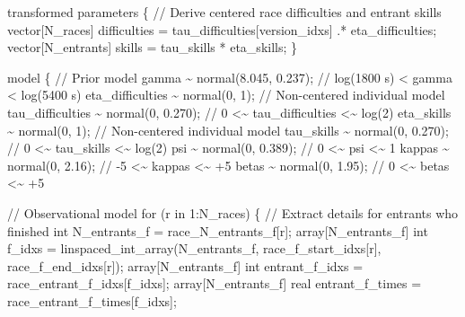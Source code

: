 \documentclass[
  letterpaper,
  DIV=11,
  numbers=noendperiod]{scrartcl}
\newenvironment{Shaded}{\begin{snugshade}}{\end{snugshade}}
\newcommand{\CommentTok}[1]{\textcolor[rgb]{0.37,0.37,0.37}{#1}}
\newcommand{\ControlFlowTok}[1]{\textcolor[rgb]{0.00,0.23,0.31}{#1}}
\newcommand{\DataTypeTok}[1]{\textcolor[rgb]{0.68,0.00,0.00}{#1}}
\newcommand{\DecValTok}[1]{\textcolor[rgb]{0.68,0.00,0.00}{#1}}
\newcommand{\FloatTok}[1]{\textcolor[rgb]{0.68,0.00,0.00}{#1}}
\newcommand{\KeywordTok}[1]{\textcolor[rgb]{0.00,0.23,0.31}{#1}}
\newcommand{\NormalTok}[1]{\textcolor[rgb]{0.00,0.23,0.31}{#1}}
\begin{document}
\begin{codelisting}
\begin{Shaded}
\begin{Highlighting}[]
\KeywordTok{transformed parameters}\NormalTok{ \{}
  \CommentTok{// Derive centered race difficulties and entrant skills}
  \DataTypeTok{vector}\NormalTok{[N\_races] difficulties}
\NormalTok{    = tau\_difficulties[version\_idxs] .* eta\_difficulties;}
  \DataTypeTok{vector}\NormalTok{[N\_entrants] skills}
\NormalTok{    = tau\_skills * eta\_skills;}
\NormalTok{\}}

\KeywordTok{model}\NormalTok{ \{}
  \CommentTok{// Prior model}
\NormalTok{  gamma \textasciitilde{} normal(}\FloatTok{8.045}\NormalTok{, }\FloatTok{0.237}\NormalTok{); }\CommentTok{// log(1800 s) \textless{} gamma \textless{} log(5400 s)}
\NormalTok{  eta\_difficulties \textasciitilde{} normal(}\DecValTok{0}\NormalTok{, }\DecValTok{1}\NormalTok{);     }\CommentTok{// Non{-}centered individual model}
\NormalTok{  tau\_difficulties \textasciitilde{} normal(}\DecValTok{0}\NormalTok{, }\FloatTok{0.270}\NormalTok{); }\CommentTok{// 0 \textless{}\textasciitilde{} tau\_difficulties \textless{}\textasciitilde{} log(2)}
\NormalTok{  eta\_skills \textasciitilde{} normal(}\DecValTok{0}\NormalTok{, }\DecValTok{1}\NormalTok{);           }\CommentTok{// Non{-}centered individual model}
\NormalTok{  tau\_skills \textasciitilde{} normal(}\DecValTok{0}\NormalTok{, }\FloatTok{0.270}\NormalTok{);       }\CommentTok{// 0 \textless{}\textasciitilde{}    tau\_skills    \textless{}\textasciitilde{} log(2)}
\NormalTok{  psi \textasciitilde{} normal(}\DecValTok{0}\NormalTok{, }\FloatTok{0.389}\NormalTok{);       }\CommentTok{// 0 \textless{}\textasciitilde{} psi \textless{}\textasciitilde{} 1}
\NormalTok{  kappas \textasciitilde{} normal(}\DecValTok{0}\NormalTok{, }\FloatTok{2.16}\NormalTok{);     }\CommentTok{// {-}5 \textless{}\textasciitilde{} kappas \textless{}\textasciitilde{} +5}
\NormalTok{  betas \textasciitilde{} normal(}\DecValTok{0}\NormalTok{, }\FloatTok{1.95}\NormalTok{);      }\CommentTok{// 0 \textless{}\textasciitilde{} betas \textless{}\textasciitilde{} +5}

  \CommentTok{// Observational model}
  \ControlFlowTok{for}\NormalTok{ (r }\ControlFlowTok{in} \DecValTok{1}\NormalTok{:N\_races) \{}
    \CommentTok{// Extract details for entrants who finished}
    \DataTypeTok{int}\NormalTok{ N\_entrants\_f = race\_N\_entrants\_f[r];}
    \DataTypeTok{array}\NormalTok{[N\_entrants\_f] }\DataTypeTok{int}\NormalTok{ f\_idxs = linspaced\_int\_array(N\_entrants\_f,}
\NormalTok{                                                         race\_f\_start\_idxs[r],}
\NormalTok{                                                         race\_f\_end\_idxs[r]);}
    \DataTypeTok{array}\NormalTok{[N\_entrants\_f] }\DataTypeTok{int}\NormalTok{ entrant\_f\_idxs = race\_entrant\_f\_idxs[f\_idxs];}
    \DataTypeTok{array}\NormalTok{[N\_entrants\_f] }\DataTypeTok{real}\NormalTok{ entrant\_f\_times = race\_entrant\_f\_times[f\_idxs];}


\end{Highlighting}
\end{Shaded}
\end{codelisting}
\end{document}
